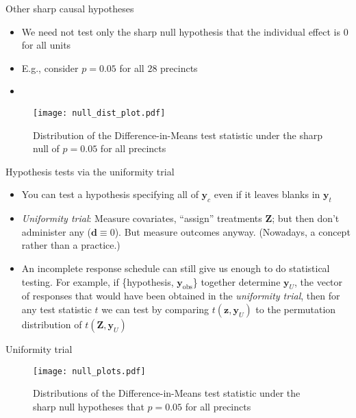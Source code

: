 \documentclass[table, xcolor={dvipsnames}, 9pt]{beamer}
\theoremstyle{newstyle}
\begin{document}
\begin{frame}{Other sharp causal hypotheses}
\begin{itemize}
\item We need not test only the sharp null hypothesis that the individual effect is $0$ for all units \pause 
\item E.g., consider $p = 0.05$ for all $28$ precincts \pause 
\item[]
\end{itemize}
\begin{figure}[H]
\texttt{[image: null\_dist\_plot.pdf]}
\caption{Distribution of the Difference-in-Means test statistic under the sharp null of $p = 0.05$ for all precincts}
\end{figure}
\end{frame}
\begin{frame}{Hypothesis tests via the uniformity trial}
\begin{itemize}
\item You can test a hypothesis specifying all of $\mathbf{y}_{c}$ even if it leaves blanks in $\mathbf{y}_{t}$ \pause 
\item \textit{Uniformity trial}:  Measure covariates, ``assign'' treatments $\mathbf{Z}$; but then don't administer any ($\mathbf{d}\equiv 0$). But measure outcomes anyway.  (Nowadays, a concept rather than a practice.) \pause 
\item An incomplete response schedule can still give us enough to do statistical testing. For example, if  \{hypothesis, $\mathbf{y}_{\mathrm{obs}}$\} together determine $\mathbf{y}_{U}$, the vector of responses that would have been obtained in the \textit{uniformity trial}, then for any test statistic $t $ we can test by comparing $t(\mathbf{z}, \mathbf{y}_{U})$ to the permutation distribution of $t(\mathbf{Z}, \mathbf{y}_{U})$
\end{itemize}
\end{frame}
\begin{frame}{Uniformity trial}
\begin{figure}[H]
\texttt{[image: null\_plots.pdf]}
\caption{Distributions of the Difference-in-Means test statistic under the sharp null hypotheses that $p = 0.05$ for all precincts}
\end{figure}
\end{frame}
\end{document}
